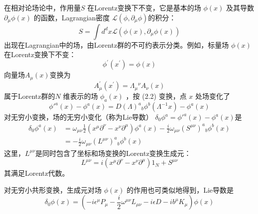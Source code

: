 在相对论场论中，作用量$ S$ 在Lorentz变换下不变，它是基本的场 $\phi( x)$ 及其导数 $\partial_\mu \phi(x)$ 的函数，Lagrangian密度 $\mathcal{L}\left(\phi, \partial_{\mu} \phi\right) $的积分：
\begin{equation}
	S=\int d^{d} x \mathcal{L}\left(\phi(x), \partial_{\mu} \phi(x)\right)
\end{equation}
出现在Lagrangian中的场，由Lorentz群的不可约表示分类。例如，标量场 $\phi(x) $在Lorentz变换下不变：
\begin{equation}
\phi^{\prime}\left(x^{\prime}\right)=\phi(x)
\end{equation}
向量场$ A_\mu(x)$变换为
\begin{equation}
	A_{\mu}^{\prime}\left(x^{\prime}\right)=\Lambda_{\mu}{}^{\nu} A_{\nu}(x)
\end{equation}
属于Lorentz群的$ N$ 维表示的场 $\phi_a(x)$ ，按 (2.2) 变换，点 $x$ 处场变化了
\[\phi'^{a}(x)-\phi^{a}(x)=D(\Lambda)^{a}{ }_{b} \phi^{b}\left(\Lambda^{-1} x\right)-\phi^{a}(x)\]
对无穷小变换，场的无穷小变化（称为Lie导数） $\delta_0\phi^a=\phi'^{a}(x)-\phi^a(x) $是
\begin{equation}
\begin{aligned} \delta_{0} \phi^{a}(x)&=\omega_{\mu \nu} \frac{1}{2}\left(x^{\mu} \partial^{\nu}-x^{\nu} \partial^{\mu}\right) \phi^{a}(x)-\frac{i}{2} \omega_{\mu \nu}\left(S^{\mu \nu}\right)^{a}{}_{b} \phi^{b}(x)\\ &=-\frac{i}{2} \omega_{\mu \nu}\left(L^{\mu \nu}\right)^{a} {}_{b}\phi^{b}(x) \end{aligned}
\end{equation}
这里，$ L^{\mu\nu} $是同时包含了坐标和场变换的Lorentz变换生成元：
\begin{equation}
	L^{\mu \nu}=i\left(x^{\mu} \partial^{\nu}-x^{\nu} \partial^{\mu}\right) 1_{N}+S^{\mu \nu}
\end{equation}
其满足Lorentz代数。

对无穷小共形变换，生成元对场 $\phi(x)$ 的作用也可类似地得到，Lie导数是
\begin{equation}
	\delta_{0} \phi(x)=\left(-i \epsilon^{\mu} P_{\mu}-\frac{i}{2} \omega^{\mu \nu} L_{\mu \nu}-i \epsilon D-i b^{\mu} K_{\mu}\right) \phi(x)
\end{equation}

